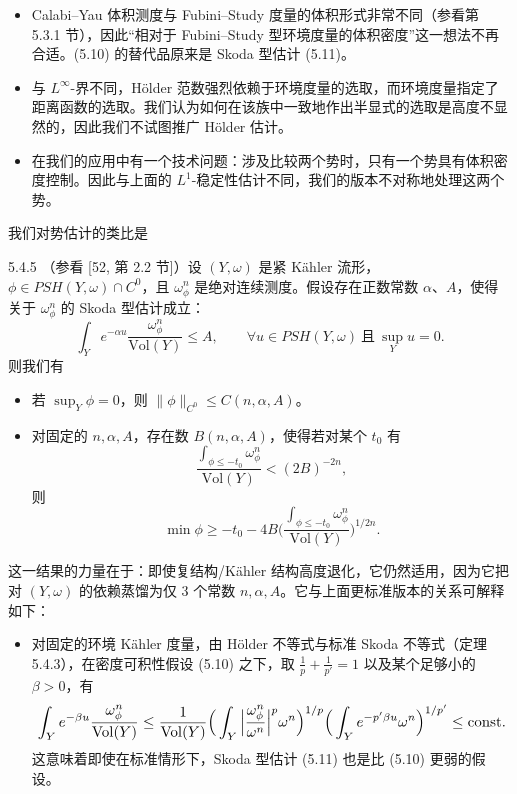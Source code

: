
\begin{itemize}
\item Calabi--Yau 体积测度与 Fubini--Study 度量的体积形式非常不同（参看第 5.3.1 节），因此“相对于 Fubini--Study 型环境度量的体积密度”这一想法不再合适。(5.10) 的替代品原来是 Skoda 型估计 (5.11)。
\item 与 $L^\infty$-界不同，Hölder 范数强烈依赖于环境度量的选取，而环境度量指定了距离函数的选取。我们认为如何在该族中一致地作出半显式的选取是高度不显然的，因此我们不试图推广 Hölder 估计。
\item 在我们的应用中有一个技术问题：涉及比较两个势时，只有一个势具有体积密度控制。因此与上面的 $L^1$-稳定性估计不同，我们的版本不对称地处理这两个势。
\end{itemize}

我们对势估计的类比是

\begin{theorem}{5.4.5}
（参看 [52, 第 2.2 节]）设 $(Y,\omega)$ 是紧 Kähler 流形，$\phi\in PSH(Y,\omega)\cap C^0$，且 $\omega_\phi^n$ 是绝对连续测度。假设存在正数常数 $\alpha$、$A$，使得关于 $\omega_\phi^n$ 的 Skoda 型估计成立：
\begin{equation}
\int_Y e^{-\alpha u}\frac{\omega_\phi^n}{\mathrm{Vol}(Y)}\le A,\qquad \forall u\in PSH(Y,\omega)\ \text{且}\ \sup_Y u=0. \tag{5.11}
\end{equation}
则我们有
\begin{itemize}
\item 若 $\sup_Y\phi=0$，则 $\|\phi\|_{C^0}\le C(n,\alpha,A)$。
\item 对固定的 $n,\alpha,A$，存在数 $B(n,\alpha,A)$，使得若对某个 $t_0$ 有
\[
\frac{\int_{\phi\le-t_0}\omega_\phi^n}{\mathrm{Vol}(Y)}<(2B)^{-2n},
\]
则
\[
\min\phi\ge -t_0-4B\Big(\frac{\int_{\phi\le-t_0}\omega_\phi^n}{\mathrm{Vol}(Y)}\Big)^{1/2n}.
\]
\end{itemize}
\end{theorem}


这一结果的力量在于：即使复结构/Kähler 结构高度退化，它仍然适用，因为它把对 $(Y,\omega)$ 的依赖蒸馏为仅 3 个常数 $n,\alpha,A$。它与上面更标准版本的关系可解释如下：
\begin{itemize}
\item 对固定的环境 Kähler 度量，由 Hölder 不等式与标准 Skoda 不等式（定理 5.4.3），在密度可积性假设 (5.10) 之下，取 $\frac{1}{p}+\frac{1}{p'}=1$ 以及某个足够小的 $\beta>0$，有
\[
\resizebox{0.97\textwidth}{!}{$\displaystyle \int_Y e^{-\beta u}\frac{\omega_\phi^n}{\mathrm{Vol}(Y)} \le \frac{1}{\mathrm{Vol}(Y)}\Big(\int_Y\Big|\frac{\omega_\phi^n}{\omega^n}\Big|^p\omega^n\Big)^{1/p}\Big(\int_Y e^{-p'\beta u}\omega^n\Big)^{1/p'}\le \mathrm{const}.$}
\]
这意味着即使在标准情形下，Skoda 型估计 (5.11) 也是比 (5.10) 更弱的假设。
\end{itemize}

